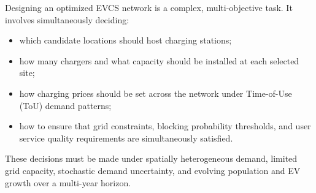 Designing an optimized EVCS network is a complex, multi-objective task.
It involves simultaneously deciding:
\begin{itemize}
  \item which candidate locations should host charging stations;
  \item how many chargers and what capacity should be installed at each
        selected site;
  \item how charging prices should be set across the network under
        Time-of-Use (ToU) demand patterns;
  \item how to ensure that grid constraints, blocking probability thresholds,
        and user service quality requirements are simultaneously satisfied.
\end{itemize}
These decisions must be made under spatially heterogeneous demand,
limited grid capacity, stochastic demand uncertainty, and evolving
population and EV growth over a multi-year horizon.

